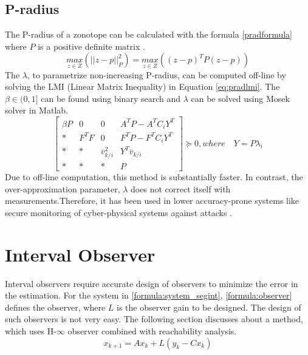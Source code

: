 \subsection{P-radius}
The P-radius of a zonotope can be calculated with the formula \eqref{pradformula} where $P$ is a positive definite matrix \cite{Alamo2005}.
\begin{equation}
\label{pradformula}
\underset{z \in Z}{max} (||z - p||^2_{P}) = \underset{z \in Z}{max}((z-p)^T P (z-p))
\end{equation}
The $\lambda$, to parametrize non-increasing P-radius, can be computed off-line by solving the LMI (Linear Matrix Inequality) in Equation \eqref{eq:pradlmi}. The $\beta \in (0,1]$ can be found using binary search and $\lambda$ can be solved using Mosek solver in Matlab\textsuperscript{\tiny\textregistered}.
\begin{equation}
\label{eq:pradlmi}
\left[
\begin{matrix}
\beta P & 0 & 0 & A^TP - A^TC_iY^T\\
* & F^TF & 0 & F^TP -F^TC_iY^T\\
* & * & \overline{v}_{k/i}^2 & Y^T\overline{v}_{k/i}\\
* & * & * & P
\end{matrix}\right] \succeq 0,
where\quad Y = P\lambda_i
\end{equation}
Due to off-line computation, this method is substantially faster. In contrast, the over-approximation parameter, $\lambda$ does not correct itself with measurements.Therefore, it has been used in lower accuracy-prone systems like secure monitoring of cyber-physical systems against attacks \cite{GE20201592}. 

\section{Interval Observer}
Interval observers require accurate design of observers to minimize the error in the estimation. For the system in \eqref{formula:system_segint}, \eqref{formula:observer} defines the observer, where $L$ is the observer gain to be designed. The design of such observers is not very easy. The following section discusses about a method, which uses H-$\infty$ observer combined with reachability analysis.
\begin{equation}
\label{formula:observer}
x_{k+1} = Ax_k + L(y_k -Cx_k)
\end{equation}

